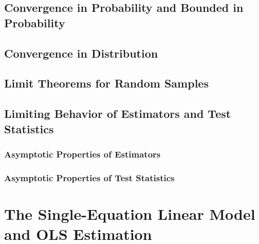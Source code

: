 \documentclass[11pt, oneside, a4paper, article]{article}
\numberwithin{equation}{section}
\begin{document}
\subsection{Convergence in Probability and Bounded in Probability}

\subsection{Convergence in Distribution}

\subsection{Limit Theorems for Random Samples}

\subsection{Limiting Behavior of Estimators and Test Statistics}

\subsubsection{Asymptotic Properties of Estimators}

\subsubsection{Asymptotic Properties of Test Statistics}

\clearpage
\section{The Single-Equation Linear Model and OLS Estimation}

\noindent
\citet[C.4 p.49--76]{wool-2010}
\end{document}
